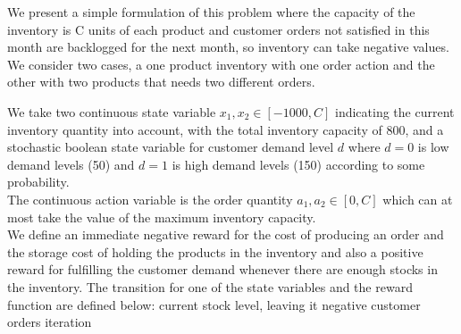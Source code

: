 \documentclass[letterpaper]{article}
\begin{document}
We present a simple formulation of this problem where the capacity of the
inventory is C units of each product and customer orders not satisfied in
this month are backlogged for the next month, so inventory can take negative
values. We consider two cases, a one product inventory with one order action
and the other with two products that needs two different orders.
 
We take two continuous state variable $x_1,x_2 \in [-1000,C]$ indicating the
current inventory quantity into account, with the total inventory capacity
of 800, and a stochastic boolean state variable for customer demand level
$d$ where $d=0$ is low demand levels (50) and $d=1$ is high demand levels
(150) according to some probability. \\
The continuous action variable is the order quantity $a_1,a_2 \in [0,C]$
which can at most take the value of the maximum inventory capacity. \\
 
We define an immediate negative reward for the cost of producing an order
and the storage cost of holding the products in the inventory and also a
positive reward for fulfilling the customer demand whenever there are enough
stocks in the inventory. The transition for one of the state variables and
the reward function are defined below:
current stock level, leaving it negative
customer orders
iteration
 
\end{document}

